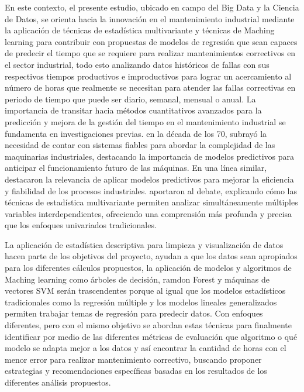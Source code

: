 \documentclass[
  11pt,
  bookmarksnumbered]{article}
\begin{document}
En este contexto, el presente estudio, ubicado en campo del Big Data y la Ciencia de Datos, se orienta hacia la innovación en el mantenimiento industrial mediante la aplicación de técnicas de estadística multivariante y técnicas de Maching learning para contribuir con propuestas de modelos de regresión que sean capaces de predecir el tiempo que se requiere para realizar mantenimientos correctivos en el sector industrial, todo esto analizando datos históricos de fallas con sus respectivos tiempos productivos e improductivos para lograr un acercamiento al número de horas que realmente se necesitan para atender las fallas correctivas en periodo de tiempo que puede ser diario, semanal, mensual o anual.
La importancia de transitar hacia métodos cuantitativos avanzados para la predicción y mejora de la gestión del tiempo en el mantenimiento industrial se fundamenta en investigaciones previas.
\textcite{Rojas} en la década de los 70, subrayó la necesidad de contar con sistemas fiables para abordar la complejidad de las maquinarias industriales, destacando la importancia de modelos predictivos para anticipar el funcionamiento futuro de las máquinas.
En una línea similar, \textcite{morochoycolegas} destacaron la relevancia de aplicar modelos predictivos para mejorar la eficiencia y fiabilidad de los procesos industriales.
\textcite{johnson2007applied} aportaron al debate, explicando cómo las técnicas de estadística multivariante permiten analizar simultáneamente múltiples variables interdependientes, ofreciendo una comprensión más profunda y precisa que los enfoques univariados tradicionales.

La aplicación de estadística descriptiva para limpieza y visualización de datos hacen parte de los objetivos del proyecto, ayudan a que los datos sean apropiados para los diferentes cálculos propuestos, la aplicación de modelos y algoritmos de Maching learning como árboles de decisión, ramdon Forest y máquinas de vectores SVM serán trascendentes porque al igual que los modelos estadísticos tradicionales como la regresión múltiple y los modelos lineales generalizados permiten trabajar temas de regresión para predecir datos.
Con enfoques diferentes, pero con el mismo objetivo se abordan estas técnicas para finalmente identificar por medio de las diferentes métricas de evaluación que algoritmo o qué modelo se adapta mejor a los datos y así encontrar la cantidad de horas con el menor error para realizar mantenimiento correctivo, buscando proponer estrategias y recomendaciones específicas basadas en los resultados de los diferentes análisis propuestos.
\end{document}
